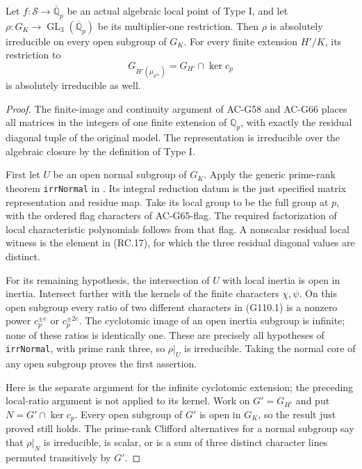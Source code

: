 \begin{lemma}
\label{AC-G110-irr}
Let \(f:\mathscr S\to\overline{\mathbb Q}_p\) be an actual
algebraic local point of Type I, and let
\(\rho:G_K\to\operatorname{GL}_3(\overline{\mathbb Q}_p)\)
be its multiplier-one restriction. Then \(\rho\) is absolutely
irreducible on every open subgroup of \(G_K\). For every finite
extension \(H'/K\), its restriction to
\[
                G_{H'(\mu_{p^\infty})}
                       =G_{H'}\cap\ker c_p
 \tag{G110.3}
\]
is absolutely irreducible as well.
\end{lemma}
\begin{proof}
The finite-image and continuity argument of AC-G58 and AC-G66
places all matrices in the integers of one finite extension of
\(\mathbb Q_p\), with exactly the residual diagonal tuple of
the original model. The representation is irreducible over
the algebraic closure by the definition of Type I.

First let \(U\) be an open normal subgroup of \(G_K\).
Apply the generic prime-rank theorem \texttt{irrNormal} in
. Its integral
reduction datum is the just specified matrix representation
and residue map. Take its local group to be the full group
at \(p\), with the ordered flag characters of AC-G65-flag.
The required factorization of local characteristic polynomials
follows from that flag. A nonscalar residual local witness is
the element in (RC.17), for which the three residual diagonal
values are distinct.

For its remaining hypothesis, the intersection of \(U\) with
local inertia is open in inertia. Intersect further with the
kernels of the finite characters \(\chi,\psi\). On this open
subgroup every ratio of two different characters in (G110.1)
is a nonzero power \(c_p^{\pm e}\) or \(c_p^{\pm2e}\).
The cyclotomic image of an open inertia subgroup is infinite;
none of these ratios is identically one. These are precisely
all hypotheses of \texttt{irrNormal}, with prime rank three,
so \(\rho|_U\) is irreducible. Taking the normal core of any
open subgroup proves the first assertion.

Here is the separate argument for the infinite cyclotomic
extension; the preceding local-ratio argument is not applied
to its kernel. Work on \(G'=G_{H'}\) and put
\(N=G'\cap\ker c_p\). Every open subgroup of \(G'\) is
open in \(G_K\), so the result just proved still holds.
The prime-rank Clifford alternatives for a normal subgroup
say that \(\rho|_N\) is irreducible, is scalar, or is a sum
of three distinct character lines permuted transitively by
\(G'\).


\end{proof}
